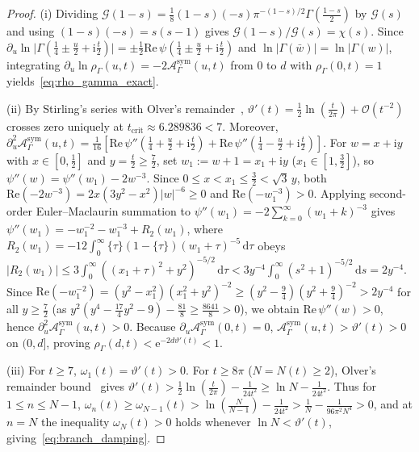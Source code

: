 \documentclass[11pt,reqno]{amsart}
\theoremstyle{definition}
\theoremstyle{remark}
\numberwithin{equation}{section}
\newcommand{\dd}{\mathrm{d}}
\newcommand{\ii}{\mathrm{i}}
\newcommand{\ee}{\mathrm{e}}
\newcommand{\Rea}{\mathrm{Re}}
\begin{document}
\begin{proof}
(i) Dividing $\mathcal{G}(1-s) = \frac{1}{8}(1-s)(-s)\pi^{-(1-s)/2}\Gamma(\frac{1-s}{2})$ by $\mathcal{G}(s)$ and using $(1-s)(-s) = s(s-1)$ gives $\mathcal{G}(1-s)/\mathcal{G}(s) = \chi(s)$. Since $\partial_u\ln\lvert\Gamma(\frac{1}{4} \pm \frac{u}{2} + \ii\frac{t}{2})\rvert = \pm\frac{1}{2}\Rea\,\psi(\frac{1}{4} \pm \frac{u}{2} + \ii\frac{t}{2})$ and $\ln\lvert\Gamma(\bar{w})\rvert = \ln\lvert\Gamma(w)\rvert$, integrating $\partial_u\ln\rho_\Gamma(u,t) = -2\mathcal{A}_\Gamma^{\mathrm{sym}}(u,t)$ from $0$ to $d$ with $\rho_\Gamma(0,t) = 1$ yields~\eqref{eq:rho_gamma_exact}.

{\sloppy
(ii) By Stirling's series with Olver's remainder~\cite{olver1997}, $\vartheta'(t) = \frac{1}{2}\ln(\frac{t}{2\pi}) + \mathcal{O}(t^{-2})$ crosses zero uniquely at $t_{\mathrm{crit}} \approx 6.289836 < 7$. Moreover, $\partial_u^2\mathcal{A}_\Gamma^{\mathrm{sym}}(u,t) = \frac{1}{16}[\Rea\,\psi''(\frac{1}{4}+\frac{u}{2}+\ii\frac{t}{2}) + \Rea\,\psi''(\frac{1}{4}-\frac{u}{2}+\ii\frac{t}{2})]$. For $w = x + \ii y$ with $x \in [0, \frac{1}{2}]$ and $y = \frac{t}{2} \ge \frac{7}{2}$, set $w_1 := w + 1 = x_1 + \ii y$ ($x_1 \in [1, \frac{3}{2}]$), so $\psi''(w) = \psi''(w_1) - 2w^{-3}$. Since $0 \le x < x_1 \le \frac{3}{2} < \sqrt{3}\,y$, both $\Rea(-2w^{-3}) = 2x(3y^2-x^2)\lvert w\rvert^{-6} \ge 0$ and $\Rea(-w_1^{-3}) > 0$. Applying second-order Euler--Maclaurin summation to $\psi''(w_1) = -2\sum_{k=0}^{\infty}(w_1+k)^{-3}$ gives $\psi''(w_1) = -w_1^{-2} - w_1^{-3} + R_2(w_1)$, where $R_2(w_1) = -12\int_0^{\infty}\{\tau\}(1-\{\tau\})(w_1+\tau)^{-5}\,\dd\tau$ obeys $\lvert R_2(w_1)\rvert \le 3\int_0^{\infty}((x_1+\tau)^2+y^2)^{-5/2}\,\dd\tau < 3y^{-4}\int_0^{\infty}(s^2+1)^{-5/2}\,\dd s = 2y^{-4}$. Since $\Rea(-w_1^{-2}) = (y^2-x_1^2)(x_1^2+y^2)^{-2} \ge (y^2 - \frac{9}{4})(y^2 + \frac{9}{4})^{-2} > 2y^{-4}$ for all $y \ge \frac{7}{2}$ (as $y^2(y^4 - \frac{17}{4}y^2 - 9) - \frac{81}{8} \ge \frac{8641}{8} > 0$), we obtain $\Rea\,\psi''(w) > 0$, hence $\partial_u^2\mathcal{A}_\Gamma^{\mathrm{sym}}(u,t) > 0$. Because $\partial_u\mathcal{A}_\Gamma^{\mathrm{sym}}(0,t) = 0$, $\mathcal{A}_\Gamma^{\mathrm{sym}}(u,t) > \vartheta'(t) > 0$ on $(0, d]$, proving $\rho_\Gamma(d,t) < \ee^{-2d\vartheta'(t)} < 1$.\par}

{\sloppy
(iii) For $t \ge 7$, $\omega_1(t) = \vartheta'(t) > 0$. For $t \ge 8\pi$ ($N = N(t) \ge 2$), Olver's remainder bound~\cite[Ch.~8]{olver1997} gives $\vartheta'(t) > \frac{1}{2}\ln(\frac{t}{2\pi}) - \frac{1}{24t^2} \ge \ln N - \frac{1}{24t^2}$. Thus for $1 \le n \le N - 1$, $\omega_n(t) \ge \omega_{N-1}(t) > \ln(\frac{N}{N-1}) - \frac{1}{24t^2} > \frac{1}{N} - \frac{1}{96\pi^2 N^4} > 0$, and at $n = N$ the inequality $\omega_N(t) > 0$ holds whenever $\ln N < \vartheta'(t)$, giving~\eqref{eq:branch_damping}.\par}
\end{proof}
\end{document}

